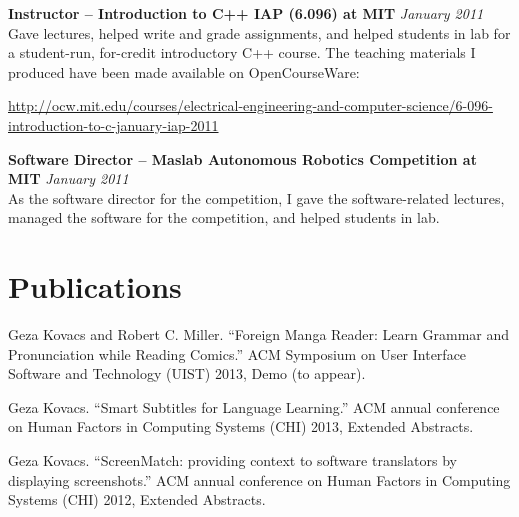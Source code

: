 \documentclass[margin,line]{resume}
\begin{document}
\begin{resume}
\textbf{Instructor -- Introduction to C++ IAP (6.096) at MIT} \hfill \textsl{January 2011}\\
Gave lectures, helped write and grade assignments, and helped students in lab for a student-run, for-credit introductory C++ course. The teaching materials I produced have been made available on OpenCourseWare:

\vspace{-4mm}

\url{http://ocw.mit.edu/courses/electrical-engineering-and-computer-science/6-096-introduction-to-c-january-iap-2011} \\

\vspace{-5mm}

\textbf{Software Director -- Maslab Autonomous Robotics Competition at MIT} \hfill \textsl{January 2011}\\
As the software director for the competition, I gave the software-related lectures,
managed the software for the competition, and helped students in lab.



\section{\mysidestyle Publications}

Geza Kovacs and Robert C. Miller. ``Foreign Manga Reader: Learn Grammar and Pronunciation while Reading Comics.'' ACM Symposium on User Interface Software and Technology (UIST) 2013, Demo (to appear).

Geza Kovacs. ``Smart Subtitles for Language Learning.'' ACM annual conference on Human Factors in Computing Systems (CHI) 2013, Extended Abstracts.%

Geza Kovacs. ``ScreenMatch: providing context to software translators by displaying screenshots.'' ACM annual conference on Human Factors in Computing Systems (CHI) 2012, Extended Abstracts.%


\end{resume}
\end{document}
